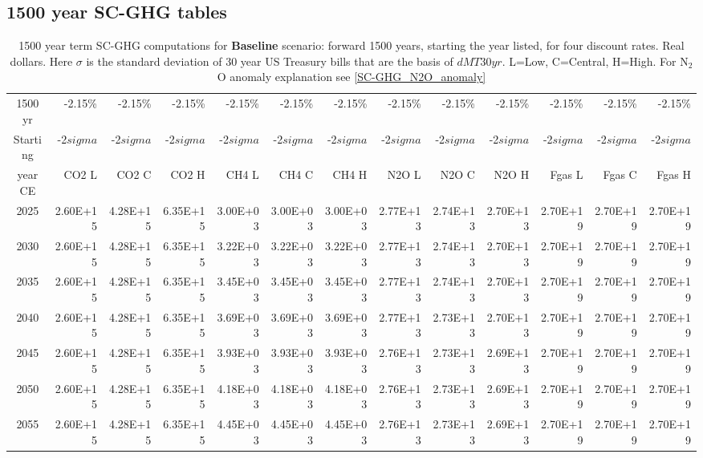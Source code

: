 \documentclass{article}
\begin{document}
\subsection{1500 year SC-GHG tables}
\begin{table}
   \caption{1500 year term SC-GHG computations for \textbf{Baseline} scenario: forward 1500 years, starting the year listed, for four discount rates. Real dollars. Here $\sigma$ is the standard deviation of 30 year US Treasury bills that are the basis of $dMT30yr$. L=Low, C=Central, H=High. For N$_2$O anomaly explanation see \ref{SC-GHG_N2O_anomaly}} 
\label{PVs_1500_yearSCC_B1}
\small
\begin{tabular}{crrr|rrr|rrr|rrr}
1500 yr  & -2.15\%   & -2.15\%   & -2.15\%   & -2.15\%   & -2.15\%   & -2.15\%   & -2.15\%   & -2.15\%   & -2.15\%   & -2.15\%   & -2.15\%   & -2.15\%   \\
Starting & -2$sigma$ & -2$sigma$ & -2$sigma$ & -2$sigma$ & -2$sigma$ & -2$sigma$ & -2$sigma$ & -2$sigma$ & -2$sigma$ & -2$sigma$ & -2$sigma$ & -2$sigma$ \\
year CE  & CO2 L     & CO2 C     & CO2 H     & CH4 L     & CH4 C     & CH4 H     & N2O L     & N2O C     & N2O H     & Fgas L    & Fgas C    & Fgas H    \\
2025     & 2.60E+15  & 4.28E+15  & 6.35E+15  & 3.00E+03  & 3.00E+03  & 3.00E+03  & 2.77E+13  & 2.74E+13  & 2.70E+13  & 2.70E+19  & 2.70E+19  & 2.70E+19  \\
2030     & 2.60E+15  & 4.28E+15  & 6.35E+15  & 3.22E+03  & 3.22E+03  & 3.22E+03  & 2.77E+13  & 2.74E+13  & 2.70E+13  & 2.70E+19  & 2.70E+19  & 2.70E+19  \\
2035     & 2.60E+15  & 4.28E+15  & 6.35E+15  & 3.45E+03  & 3.45E+03  & 3.45E+03  & 2.77E+13  & 2.74E+13  & 2.70E+13  & 2.70E+19  & 2.70E+19  & 2.70E+19  \\
2040     & 2.60E+15  & 4.28E+15  & 6.35E+15  & 3.69E+03  & 3.69E+03  & 3.69E+03  & 2.77E+13  & 2.73E+13  & 2.70E+13  & 2.70E+19  & 2.70E+19  & 2.70E+19  \\
2045     & 2.60E+15  & 4.28E+15  & 6.35E+15  & 3.93E+03  & 3.93E+03  & 3.93E+03  & 2.76E+13  & 2.73E+13  & 2.69E+13  & 2.70E+19  & 2.70E+19  & 2.70E+19  \\
2050     & 2.60E+15  & 4.28E+15  & 6.35E+15  & 4.18E+03  & 4.18E+03  & 4.18E+03  & 2.76E+13  & 2.73E+13  & 2.69E+13  & 2.70E+19  & 2.70E+19  & 2.70E+19  \\
2055     & 2.60E+15  & 4.28E+15  & 6.35E+15  & 4.45E+03  & 4.45E+03  & 4.45E+03  & 2.76E+13  & 2.73E+13  & 2.69E+13  & 2.70E+19  & 2.70E+19  & 2.70E+19  \\

\end{tabular}
\end{table}
\end{document}
